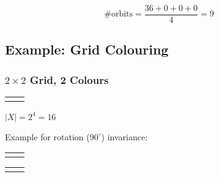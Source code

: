 \documentclass[11pt]{article}
\begin{document}
\[ \#\text{orbits} = \frac{36 + 0 + 0 + 0}{4} = 9 \]

\subsection{Example: Grid Colouring}

\subsubsection{$ 2 \times 2 $ Grid, 2 Colours}

\begin{tabular}{| c | c |}
\hline
& \\
\hline
& \\
\hline
\end{tabular} \newline

$ | X | = 2^4 = 16 $ \newline

Example for rotation ($90^\circ$) invariance:

\begin{tabular}{| c | c |}
\hline
\cellcolor{darkblue} & \cellcolor{darkblue} \\
\hline
\cellcolor{darkgreen} & \cellcolor{darkblue} \\
\hline
\end{tabular}
\hspace{1em}
\begin{tabular}{| c | c |}
\hline
\cellcolor{darkgreen} & \cellcolor{darkblue} \\
\hline
\cellcolor{darkblue} & \cellcolor{darkblue} \\
\hline
\end{tabular} \newline
\end{document}
